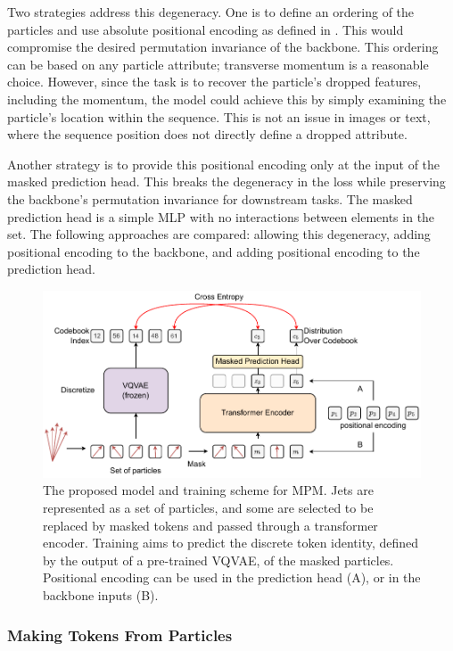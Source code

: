 Two strategies address this degeneracy.
One is to define an ordering of the particles and use absolute positional encoding as defined in .
This would compromise the desired permutation invariance of the backbone.
This ordering can be based on any particle attribute; transverse momentum is a reasonable choice.
However, since the task is to recover the particle's dropped features, including the momentum, the model could achieve this by simply examining the particle's location within the sequence.
This is not an issue in images or text, where the sequence position does not directly define a dropped attribute.

Another strategy is to provide this positional encoding only at the input of the masked prediction head.
This breaks the degeneracy in the loss while preserving the backbone's permutation invariance for downstream tasks.
The masked prediction head is a simple MLP with no interactions between elements in the set.
The following approaches are compared: allowing this degeneracy, adding positional encoding to the backbone, and adding positional encoding to the prediction head.

\begin{figure}
    \centering
    \includegraphics[width=0.99\linewidth]{Figures/foundation_models/mpm1.pdf}
    \caption{
        The proposed model and training scheme for MPM.
        Jets are represented as a set of particles, and some are selected to be replaced by masked tokens and passed through a transformer encoder.
        Training aims to predict the discrete token identity, defined by the output of a pre-trained VQVAE, of the masked particles.
        Positional encoding can be used in the prediction head (A), or in the backbone inputs (B).
    }
    \label{fig:mpm1}
\end{figure}

\subsubsection{Making Tokens From Particles}
\label{subsec:vqvae}

